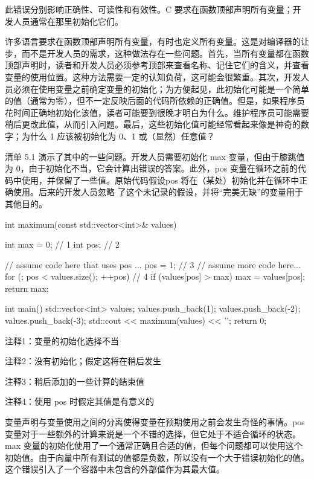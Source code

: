 此错误分别影响正确性、可读性和有效性。C 要求在函数顶部声明所有变量；开发人员通常在那里初始化它们。


许多语言要求在函数顶部声明所有变量，有时也定义所有变量。这是对编译器的让步，而不是开发人员的需求，这种做法存在一些问题。首先，当所有变量都在函数顶部声明时，读者和开发人员必须参考顶部来查看名称、记住它们的含义，并查看变量的使用位置。这种方法需要一定的认知负荷，这可能会很繁重。其次，开发人员必须在使用变量之前确定变量的初始化；为方便起见，此初始化可能是一个简单的值（通常为零），但不一定反映后面的代码所依赖的正确值。但是，如果程序员花时间正确地初始化该值，读者可能要到很晚才明白为什么。维护程序员可能需要稍后更改此值，从而引入问题。最后，这些初始化值可能经常看起来像是神奇的数字；为什么 1 应该被初始化为 0、1 或（显然）任意值？

清单 5.1 演示了其中的一些问题。开发人员需要初始化 max 变量，但由于膝跳值为 0，由于初始化不当，它会计算出错误的答案。此外，pos 变量在循环之前的代码中使用，并保留了一些值。原始代码假设pos 将在（某处）初始化并在循环中正确使用。后来的开发人员忽略 了这个未记录的假设，并将“完美无缺”的变量用于其他目的。


\begin{cpp}
int maximum(const std::vector<int>& values) {
  int max = 0; // 1
  int pos; // 2

  // assume code here that uses pos ...
  pos = 1; // 3
  // assume more code here...
  for (; pos < values.size(); ++pos) // 4
    if (values[pos] > max)
      max = values[pos];
  return max;
}

int main() {
  std::vector<int> values;
  values.push_back(1);
  values.push_back(-2);
  values.push_back(-3);
  std::cout << maximum(values) << '\n';
  return 0;
}
\end{cpp}

{\footnotesize
注释1：变量的初始化选择不当

注释2：没有初始化；假定这将在稍后发生

注释3：稍后添加的一些计算的结束值

注释4：使用 pos 时假定其值是有意义的
}


变量声明与变量使用之间的分离使得变量在预期使用之前会发生奇怪的事情。pos 变量对于一些额外的计算来说是一个不错的选择，但它处于不适合循环的状态。max 变量的初始化使用了一个通常正确且合适的值，但每个问题都可以使用这个初始值。由于向量中所有测试的值都是负数，所以没有一个大于错误初始化的值。这个错误引入了一个容器中未包含的外部值作为其最大值。

